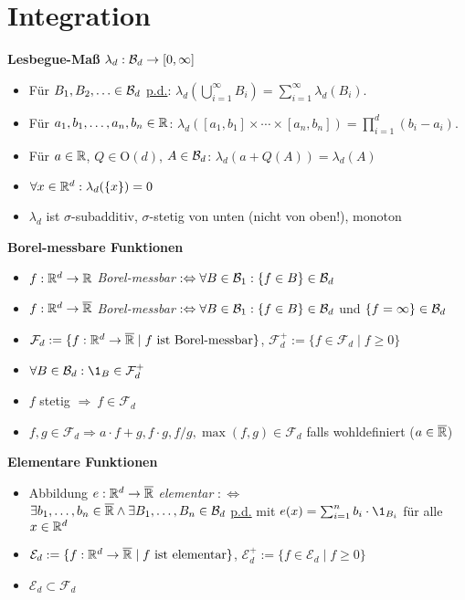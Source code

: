 \section{Integration}

\textbf{Lesbegue-Maß} $\lambda_d: \mathcal{B}_{d}\to [0,\infty]$
\begin{itemize}
\item Für $B_1,B_2,\ldots\in\mathcal{B}_{d}$ \underline{p.d.}:
$\lambda_d(\bigcup_{i=1}^{\infty} B_i)=\sum_{i=1}^{\infty}\lambda_d(B_i)$.

\item Für $a_1,b_1,\ldots,a_n,b_n\in\mathbb{R}$:
$\lambda_d([a_1,b_1]\times\cdots\times[a_n,b_n])=\prod_{i=1}^{d}(b_i-a_i)$.

\item Für $a\in\mathbb{R}$, $Q\in\mathrm{O}(d)$, $A\in\mathcal{B}_{d}$: $\lambda_d(a+Q(A))=\lambda_d(A)$

\item $\forall x\in\mathbb{R}^d: \lambda_d(\{x\})=0$

\item $\lambda_d$ ist $\sigma$-subadditiv, $\sigma$-stetig von unten
(nicht von oben!), monoton
\end{itemize}

\textbf{Borel-messbare Funktionen}
\begin{itemize}
\item $f:\mathbb{R}^d\to\mathbb{R}$ \textit{Borel-messbar}
$:\Leftrightarrow\forall B\in\mathcal{B}_{1}: \{f\in B\}\in\mathcal{B}_{d}$

\item $f:\mathbb{R}^d\to\overline{\mathbb{R}}$ \textit{Borel-messbar}
$:\Leftrightarrow\forall B\in\mathcal{B}_{1}: \{f\in B\}\in\mathcal{B}_{d}$ und $\{f=\infty\}\in\mathcal{B}_{d}$

\item $\mathcal{F}_d:=\{f:\mathbb{R}^d\to\overline{\mathbb{R}}\mid f \text{ ist Borel-messbar}\}$,
$\mathcal{F}_d^+ :=\{f\in\mathcal{F}_d\mid f\geq 0\}$

\item $\forall B\in\B{d}: \1_B\in\mathcal{F}_d^+$

\item $f$ stetig $\Rightarrow\ f\in\mathcal{F}_d$

\item $f,g\in\mathcal{F}_d\Rightarrow a\cdot f+g, f\cdot g, f/g,
\operatorname{max}(f,g)\in\mathcal{F}_d$ falls wohldefiniert ($a\in\overline{\mathbb{R}}$)
\end{itemize}

\textbf{Elementare Funktionen}
\begin{itemize}

\item Abbildung $e:\mathbb{R}^d\to\overline{\mathbb{R}}$ \textit{elementar} $:\Leftrightarrow$\\
$\exists b_1,\ldots,b_n\in\overline{\mathbb{R}}\wedge\exists B_1,\ldots,B_n\in\mathcal{B}_{d}$
\underline{p.d.} mit $e(x)=\sum_{i=1}^{n} b_i\cdot \1_{B_i}$ für alle $x\in\mathbb{R}^d$

\item $\mathcal{E}_d:=\{f:\mathbb{R}^d\to\overline{\mathbb{R}}\mid f \text{ ist elementar}\}$,
$\mathcal{E}_d^+:=\{f\in\mathcal{E}_d\mid f\geq 0\}$

\item $\mathcal{E}_d\subset\mathcal{F}_d$
\end{itemize}

